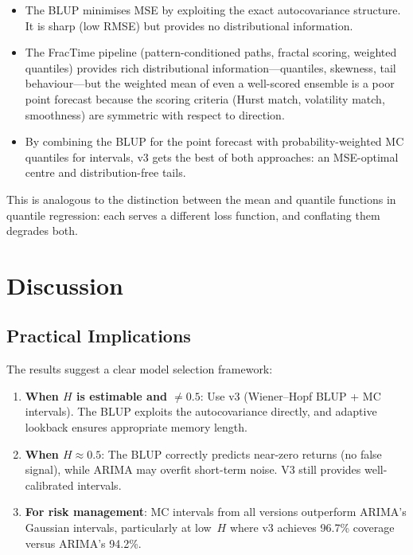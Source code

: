 \documentclass[12pt,a4paper]{article}
\begin{document}
\begin{itemize}
  \item The BLUP minimises MSE by exploiting the exact autocovariance
        structure.  It is sharp (low RMSE) but provides no distributional
        information.
  \item The FracTime pipeline (pattern-conditioned paths, fractal scoring,
        weighted quantiles) provides rich distributional
        information---quantiles, skewness, tail behaviour---but the weighted
        mean of even a well-scored ensemble is a poor point forecast because
        the scoring criteria (Hurst match, volatility match, smoothness)
        are symmetric with respect to direction.
  \item By combining the BLUP for the point forecast with
        probability-weighted MC quantiles for intervals, v3 gets the best
        of both approaches: an MSE-optimal centre and distribution-free
        tails.
\end{itemize}

This is analogous to the distinction between the mean and quantile
functions in quantile regression: each serves a different loss function,
and conflating them degrades both.

\section{Discussion}
\label{sec:discussion}

\subsection{Practical Implications}

The results suggest a clear model selection framework:

\begin{enumerate}
  \item \textbf{When $H$ is estimable and $\neq 0.5$}: Use v3
        (Wiener--Hopf BLUP + MC intervals).  The BLUP exploits the
        autocovariance directly, and adaptive lookback ensures
        appropriate memory length.
  \item \textbf{When $H \approx 0.5$}: The BLUP correctly predicts
        near-zero returns (no false signal), while ARIMA may overfit
        short-term noise.  V3 still provides well-calibrated intervals.
  \item \textbf{For risk management}: MC intervals from all versions
        outperform ARIMA's Gaussian intervals, particularly at low~$H$
        where v3 achieves 96.7\% coverage versus ARIMA's 94.2\%.
\end{enumerate}
\end{document}
